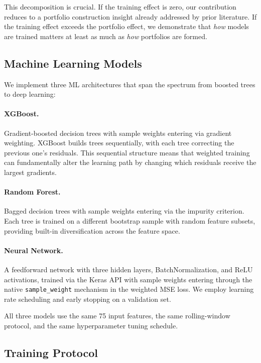 \documentclass[a4paper,12pt,final]{article}
\begin{document}
This decomposition is crucial. If the training effect is zero, our contribution reduces to a portfolio construction insight already addressed by prior literature. If the training effect exceeds the portfolio effect, we demonstrate that \emph{how} models are trained matters at least as much as \emph{how} portfolios are formed.

\subsection{Machine Learning Models}
\label{subsec:ml_models}

We implement three ML architectures that span the spectrum from boosted trees to deep learning:

\paragraph{XGBoost.} Gradient-boosted decision trees with sample weights entering via gradient weighting. XGBoost builds trees sequentially, with each tree correcting the previous one's residuals. This sequential structure means that weighted training can fundamentally alter the learning path by changing which residuals receive the largest gradients.

\paragraph{Random Forest.} Bagged decision trees with sample weights entering via the impurity criterion. Each tree is trained on a different bootstrap sample with random feature subsets, providing built-in diversification across the feature space.

\paragraph{Neural Network.} A feedforward network with three hidden layers, BatchNormalization, and ReLU activations, trained via the Keras API with sample weights entering through the native \texttt{sample\_weight} mechanism in the weighted MSE loss. We employ learning rate scheduling and early stopping on a validation set.

All three models use the same 75 input features, the same rolling-window protocol, and the same hyperparameter tuning schedule.

\subsection{Training Protocol}
\label{subsec:training_protocol}
\end{document}
